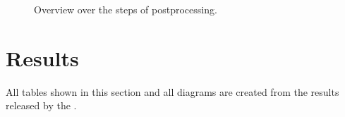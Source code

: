 \begin{figure}
\hfill
{}\hfill	
{}

\caption{Overview over the steps of postprocessing.}
\label{postproc}	

\end{figure}

\section{Results}
All tables shown in this section and all diagrams are created from the results released by the \cite{challenge}.
